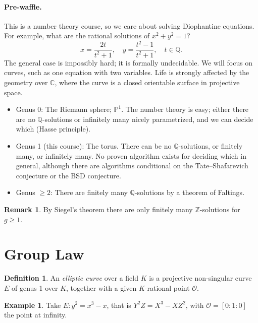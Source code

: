 \documentclass[a4paper]{article}
\theoremstyle{definition}
\newtheorem*{definition}{Definition}
\newtheorem*{remark}{Remark}
\newtheorem*{example}{Example}
\renewcommand{\P}{\mathbb{P}}
\renewcommand{\O}{\mathcal{O}}
\newcommand{\Z}{\mathbb{Z}}
\newcommand{\Q}{\mathbb{Q}}
\newcommand{\C}{\mathbb{C}}
\begin{document}
\paragraph{Pre-waffle.}
This is a number theory course, so we care about solving Diophantine equations.
For example, what are the rational solutions of $x^2+y^2=1$?
\begin{equation*}
    x = \frac{2t}{t^2+1}, \quad y = \frac{t^2-1}{t^2+1}, \quad t\in\Q.
\end{equation*}
The general case is impossibly hard; it is formally undecidable. We will focus
on curves, such as one equation with two variables. Life is strongly affected by
the geometry over $\C$, where the curve is a closed orientable surface in
projective space.
\begin{itemize}
    \item Genus 0: The Riemann sphere; $\P^1$. The number theory is easy; either
        there are no $\Q$-solutions or infinitely many nicely parametrized, and
        we can decide which (Hasse principle).

    \item Genus 1 (this course): The torus. There can be no $\Q$-solutions, or
        finitely many, or infinitely many. No proven algorithm exists for
        deciding which in general, although there are algorithms conditional on
        the Tate--Shafarevich conjecture or the BSD conjecture.

    \item Genus $\ge2$: There are finitely many $\Q$-solutions by a theorem of
        Faltings.
\end{itemize}

\begin{remark}
    By Siegel's theorem there are only finitely many $\Z$-solutions for $g\ge1$.
\end{remark}

\section{Group Law}

\begin{definition}
    An \emph{elliptic curve} over a field $K$ is a projective non-singular curve
    $E$ of genus 1 over $K$, together with a given $K$-rational point $\O$.
\end{definition}

\begin{example}
    Take $E:y^2=x^3-x$, that is $Y^2Z=X^3-XZ^2$, with $\O=[0:1:0]$ the
    point at infinity.
\end{example}
\end{document}
